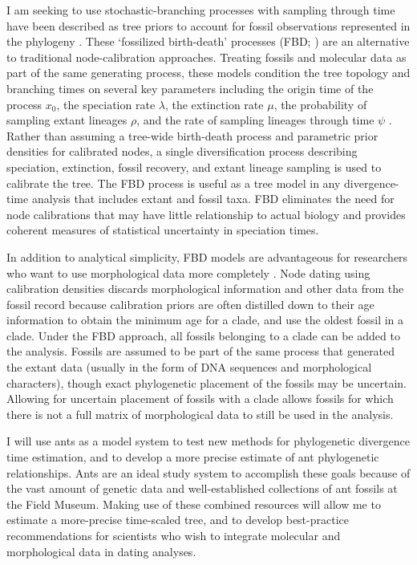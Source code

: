 \documentclass[]{article}
\begin{document}
I am seeking to use stochastic-branching processes with sampling through time have been described as tree priors to account for fossil observations represented in the phylogeny \citep{Heath22072014, Stadler2010396,  Didier201226, gavryushkina2015bayesian,  Zhang22102015}. These ‘fossilized birth-death’ processes (FBD; \citep{Heath22072014}) are an alternative to traditional node-calibration approaches. Treating fossils and molecular data as part of the same generating process, these models condition the tree topology and branching times on several key parameters including the origin time of the process $x_0$, the speciation rate $\lambda$, the extinction rate $\mu$, the probability of sampling extant lineages $\rho$, and the rate of sampling lineages through time $\psi$ \citep{Heath22072014, Stadler2010396}. Rather than assuming a tree-wide birth-death process and parametric prior densities for calibrated nodes, a single diversification process describing speciation, extinction, fossil recovery, and extant lineage sampling is used to calibrate the tree. The FBD process is useful as a tree model in any divergence-time analysis that includes extant and fossil taxa. FBD eliminates the need for node calibrations that may have little relationship to actual biology and provides coherent measures of statistical uncertainty in speciation times.\par
In addition to analytical simplicity, FBD models are advantageous for researchers who want to use morphological data more completely \citep{gavryushkina2015bayesian, Zhang22102015}. Node dating using calibration densities discards morphological information and other data from the fossil record because calibration priors are often distilled down to their age information to obtain the minimum age for a clade, and use the oldest fossil in a clade. Under the FBD approach, all fossils belonging to a clade can be added to the analysis. Fossils are assumed to be part of the same process that generated the extant data (usually in the form of DNA sequences and morphological characters), though exact phylogenetic placement of the fossils may be uncertain. Allowing for uncertain placement of fossils with a clade allows fossils for which there is not a full matrix of morphological data to still be used in the analysis. \par    
    I  will use ants as a model system to test new methods for phylogenetic divergence time estimation, and to develop a more precise estimate of ant phylogenetic relationships. Ants are an ideal study system to accomplish these goals because of the vast amount of genetic data and well-established collections of ant fossils at the Field Museum. Making use of these combined resources will allow me to estimate a more-precise time-scaled tree, and to develop best-practice recommendations for scientists who wish to integrate molecular and morphological data in dating analyses. \par
\end{document}
